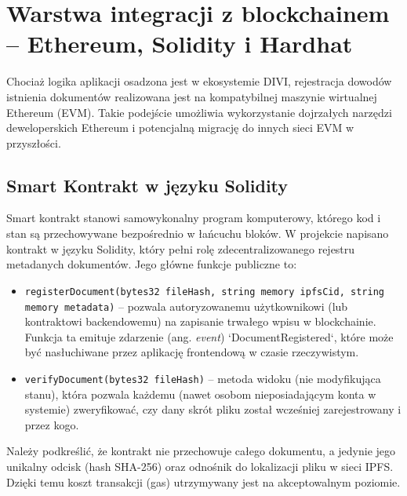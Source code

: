 \documentclass[12pt,a4paper,twoside]{report}
\begin{document}
\section{Warstwa integracji z blockchainem -- Ethereum, Solidity i Hardhat}

Chociaż logika aplikacji osadzona jest w ekosystemie DIVI, rejestracja dowodów istnienia dokumentów realizowana jest na kompatybilnej maszynie wirtualnej Ethereum (EVM). Takie podejście umożliwia wykorzystanie dojrzałych narzędzi deweloperskich Ethereum i potencjalną migrację do innych sieci EVM w przyszłości.

\subsection{Smart Kontrakt w języku Solidity}
Smart kontrakt stanowi samowykonalny program komputerowy, którego kod i stan są przechowywane bezpośrednio w łańcuchu bloków. W projekcie napisano kontrakt w języku Solidity, który pełni rolę zdecentralizowanego rejestru metadanych dokumentów. Jego główne funkcje publiczne to:
\begin{itemize}
    \item \texttt{registerDocument(bytes32 fileHash, string memory ipfsCid, string memory metadata)} -- pozwala autoryzowanemu użytkownikowi (lub kontraktowi backendowemu) na zapisanie trwałego wpisu w blockchainie. Funkcja ta emituje zdarzenie (ang. \textit{event}) `DocumentRegistered`, które może być nasłuchiwane przez aplikację frontendową w czasie rzeczywistym.
    \item \texttt{verifyDocument(bytes32 fileHash)} -- metoda widoku (nie modyfikująca stanu), która pozwala każdemu (nawet osobom nieposiadającym konta w systemie) zweryfikować, czy dany skrót pliku został wcześniej zarejestrowany i przez kogo.
\end{itemize}
Należy podkreślić, że kontrakt nie przechowuje całego dokumentu, a jedynie jego unikalny odcisk (hash SHA-256) oraz odnośnik do lokalizacji pliku w sieci IPFS. Dzięki temu koszt transakcji (gas) utrzymywany jest na akceptowalnym poziomie.
\end{document}
